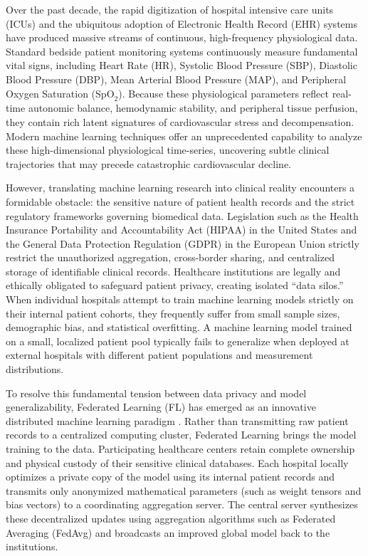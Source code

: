 \documentclass[12pt,a4paper,oneside]{report}
\begin{document}
Over the past decade, the rapid digitization of hospital intensive care units (ICUs) and the ubiquitous adoption of Electronic Health Record (EHR) systems have produced massive streams of continuous, high-frequency physiological data. Standard bedside patient monitoring systems continuously measure fundamental vital signs, including Heart Rate (HR), Systolic Blood Pressure (SBP), Diastolic Blood Pressure (DBP), Mean Arterial Blood Pressure (MAP), and Peripheral Oxygen Saturation ($\text{SpO}_2$). Because these physiological parameters reflect real-time autonomic balance, hemodynamic stability, and peripheral tissue perfusion, they contain rich latent signatures of cardiovascular stress and decompensation. Modern machine learning techniques offer an unprecedented capability to analyze these high-dimensional physiological time-series, uncovering subtle clinical trajectories that may precede catastrophic cardiovascular decline.

However, translating machine learning research into clinical reality encounters a formidable obstacle: the sensitive nature of patient health records and the strict regulatory frameworks governing biomedical data. Legislation such as the Health Insurance Portability and Accountability Act (HIPAA) in the United States and the General Data Protection Regulation (GDPR) in the European Union strictly restrict the unauthorized aggregation, cross-border sharing, and centralized storage of identifiable clinical records. Healthcare institutions are legally and ethically obligated to safeguard patient privacy, creating isolated ``data silos.'' When individual hospitals attempt to train machine learning models strictly on their internal patient cohorts, they frequently suffer from small sample sizes, demographic bias, and statistical overfitting. A machine learning model trained on a small, localized patient pool typically fails to generalize when deployed at external hospitals with different patient populations and measurement distributions.

To resolve this fundamental tension between data privacy and model generalizability, Federated Learning (FL) has emerged as an innovative distributed machine learning paradigm \citep{mcmahan2017communication, rieke2020future}. Rather than transmitting raw patient records to a centralized computing cluster, Federated Learning brings the model training to the data. Participating healthcare centers retain complete ownership and physical custody of their sensitive clinical databases. Each hospital locally optimizes a private copy of the model using its internal patient records and transmits only anonymized mathematical parameters (such as weight tensors and bias vectors) to a coordinating aggregation server. The central server synthesizes these decentralized updates using aggregation algorithms such as Federated Averaging (FedAvg) and broadcasts an improved global model back to the institutions.
\end{document}
